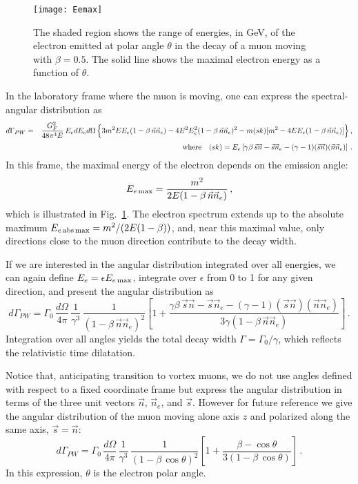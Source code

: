 \documentclass[aps,prd,longbibliography,nofootinbib,amsthm,amsmath,amssymb,amsfonts,notitlepage]{revtex4-1}
\begin{document}
\begin{figure}[H]
	\centering
	\texttt{[image: Eemax]}
	\caption{The shaded region shows the range of energies, in GeV, of the electron emitted at polar angle $\theta$ in the decay
		of a muon moving with $\beta = 0.5$. The solid line shows the maximal electron energy as a function of $\theta$.}\label{Fig-EmaxPW}
\end{figure}

In the laboratory frame where the muon is moving, one can express the spectral-angular distribution as
\begin{eqnarray}
d\Gamma_{PW} &=& \frac{G_F^2}{48\pi^4 E}\, E_e dE_e d\Omega\, \Bigl\{
3 m^2 E E_e(1-\beta\, \vec n\vec n_e) - 4 E^2 E_e^2 (1-\beta\, \vec n\vec n_e)^2 - m(sk) [m^2 - 4 E E_e (1-\beta\, \vec n\vec n_e)]\Bigr\}\,,
\label{PWresult-3}\\[1mm]
&&\mbox{where}\quad (sk) = E_e\left[\gamma\beta\, \vec s \vec n - \vec s \vec n_e - (\gamma-1)(\vec s\vec n)(\vec n \vec n_e)\right]\,.
\end{eqnarray}
In this frame, the maximal energy of the electron depends on the emission angle:
\begin{equation}
E_{e\,\rm max} = \frac{m^2}{2E (1-\beta\, \vec n\vec n_e)}\,,\label{Emax}
\end{equation}
which is illustrated in Fig.~\ref{Fig-EmaxPW}.
The electron spectrum extends up to the absolute maximum $E_{e\,\rm abs\, max} = m^2/(2E(1-\beta))$,
and, near this maximal value, only directions close to the muon direction contribute to the decay width.

If we are interested in the angular distribution integrated over all energies,
we can again define $E_e = \epsilon E_{e\,\rm max}$, integrate over $\epsilon$ from 0 to 1 for any given direction,
and present the angular distribution as
\begin{equation}
d\Gamma_{PW} = \Gamma_0\, \frac{d\Omega}{4\pi} \, \frac{1}{\gamma^3}\, \frac{1}{(1-\beta\, \vec n\vec n_e)^2}
\left[1 + \frac{\gamma\beta\, \vec s \vec n - \vec s \vec n_e - (\gamma-1)(\vec s\vec n)(\vec n \vec n_e)}{3\gamma (1-\beta\, \vec n\vec n_e)}\right]\,.
\label{PWresult-4}
\end{equation}
Integration over all angles yields the total decay width $\Gamma = \Gamma_0/\gamma$, which reflects the relativistic time dilatation.

Notice that, anticipating transition to vortex muons, we do not use angles defined with respect to a fixed coordinate frame
but express the angular distribution in terms of the three unit vectors $\vec n$, $\vec n_e$, and $\vec s$.
However for future reference we give the angular distribution of the muon moving alone axis $z$
and polarized along the same axis, $\vec s = \vec n$:
\begin{equation}
d\Gamma_{PW} = \Gamma_0\, \frac{d\Omega}{4\pi} \, \frac{1}{\gamma^3}\, \frac{1}{(1-\beta\, \cos\theta)^2}
\left[1 + \frac{\beta-\cos\theta}{3(1-\beta\, \cos\theta)}\right]\,.
\label{PWresult-4.1}
\end{equation}	
In this expression, $\theta$ is the electron polar angle.
\end{document}
